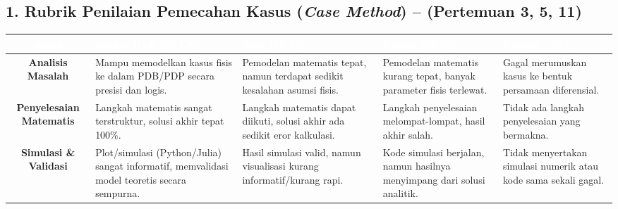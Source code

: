 \documentclass[11pt,a4paper]{article}
\begin{document}
\subsection*{1. Rubrik Penilaian Pemecahan Kasus (\textit{Case Method}) -- (Pertemuan 3, 5, 11)}
\begin{table}[h]
\centering
\begin{tabularx}{\textwidth}{|c|X|X|X|X|}
\hline
\rowcolor{unibblue}
\textcolor{white}{\textbf{Aspek}} & \textcolor{white}{\textbf{Sangat Baik (85-100)}} & \textcolor{white}{\textbf{Baik (70-84)}} & \textcolor{white}{\textbf{Cukup (55-69)}} & \textcolor{white}{\textbf{Kurang (<55)}} \\ \hline
\textbf{Analisis Masalah} & Mampu memodelkan kasus fisis ke dalam PDB/PDP secara presisi dan logis. & Pemodelan matematis tepat, namun terdapat sedikit kesalahan asumsi fisis. & Pemodelan matematis kurang tepat, banyak parameter fisis terlewat. & Gagal merumuskan kasus ke bentuk persamaan diferensial. \\ \hline
\textbf{Penyelesaian Matematis} & Langkah matematis sangat terstruktur, solusi akhir tepat 100\%. & Langkah matematis dapat diikuti, solusi akhir ada sedikit eror kalkulasi. & Langkah penyelesaian melompat-lompat, hasil akhir salah. & Tidak ada langkah penyelesaian yang bermakna. \\ \hline
\textbf{Simulasi \& Validasi} & Plot/simulasi (Python/Julia) sangat informatif, memvalidasi model teoretis secara sempurna. & Hasil simulasi valid, namun visualisasi kurang informatif/kurang rapi. & Kode simulasi berjalan, namun hasilnya menyimpang dari solusi analitik. & Tidak menyertakan simulasi numerik atau kode sama sekali gagal. \\ \hline
\end{tabularx}
\end{table}
\vspace{0.3cm}
\end{document}
